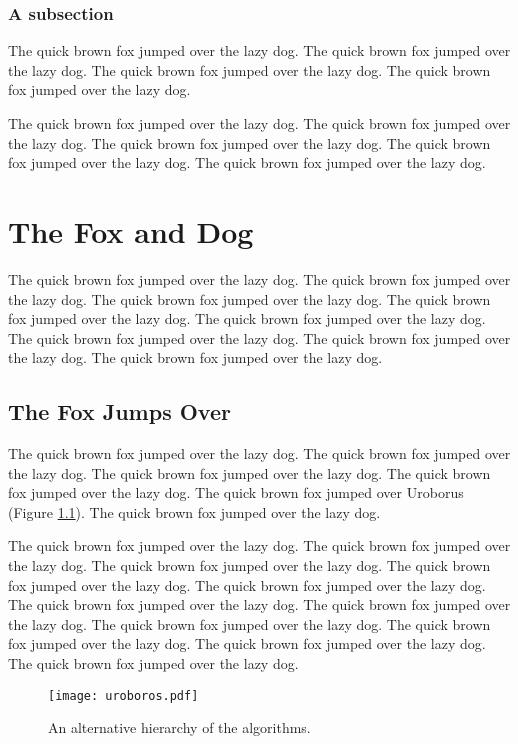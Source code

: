 \documentclass{l4proj}
\begin{document}
\subsection{A subsection}
The quick brown fox jumped over the lazy dog.
The quick brown fox jumped over the lazy dog.
The quick brown fox jumped over the lazy dog.
The quick brown fox jumped over the lazy dog.

The quick brown fox jumped over the lazy dog.
The quick brown fox jumped over the lazy dog.
The quick brown fox jumped over the lazy dog.
The quick brown fox \cite{fahle} jumped over the lazy dog.
The quick brown fox jumped over the lazy dog.

\chapter{The Fox and Dog}
The quick brown fox jumped over the lazy dog.
The quick brown fox jumped over the lazy dog.
The quick brown fox jumped over the lazy dog.
The quick brown fox jumped over the lazy dog.
The quick brown fox jumped over the lazy dog.
The quick brown fox jumped over the lazy dog.
The quick brown fox jumped over the lazy dog.
The quick brown fox jumped over the lazy dog.

\section{The Fox Jumps Over}
The quick brown fox jumped over the lazy dog.
The quick brown fox jumped over the lazy dog.
The quick brown fox jumped over the lazy dog.
The quick brown fox jumped over the lazy dog.
The quick brown fox jumped over Uroborus (Figure \ref{uroborus}).
The quick brown fox jumped over the lazy dog.

The quick brown fox jumped over the lazy dog.
The quick brown fox jumped over the lazy dog.
The quick brown fox jumped over the lazy dog.
The quick brown fox jumped over the lazy dog.
The quick brown fox jumped over the lazy dog.
The quick brown fox jumped over the lazy dog.
The quick brown fox jumped over the lazy dog.
The quick brown fox jumped over the lazy dog.
The quick brown fox jumped over the lazy dog.
The quick brown fox jumped over the lazy dog.
The quick brown fox jumped over the lazy dog.

\begin{figure}
\centering
\texttt{[image: uroboros.pdf]}
\vspace{-30mm}
\caption{An alternative hierarchy of the algorithms.}
\label{uroborus}
\end{figure}
\end{document}

